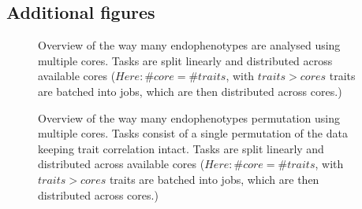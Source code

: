 \subsection*{Additional figures}
	\begin{figure}[ht]
	  \hfill
	  \caption{Overview of the way many endophenotypes are analysed using multiple cores. Tasks are split linearly and distributed across available cores ($Here: \# core = \# traits$, with $traits > cores$ traits are batched into jobs, which are then distributed across cores.)}
	  \label{fig:MTstrait}
	\end{figure}
	
	\begin{figure}[ht]
	  \hfill
	  \caption{Overview of the way many endophenotypes permutation using multiple cores. Tasks consist of a single permutation of the data keeping trait correlation intact. Tasks are split linearly and distributed across available cores ($Here: \# core = \# traits$, with $traits > cores$ traits are batched into jobs, which are then distributed across cores.)}
	  \label{fig:MTperm}
	\end{figure}
	
